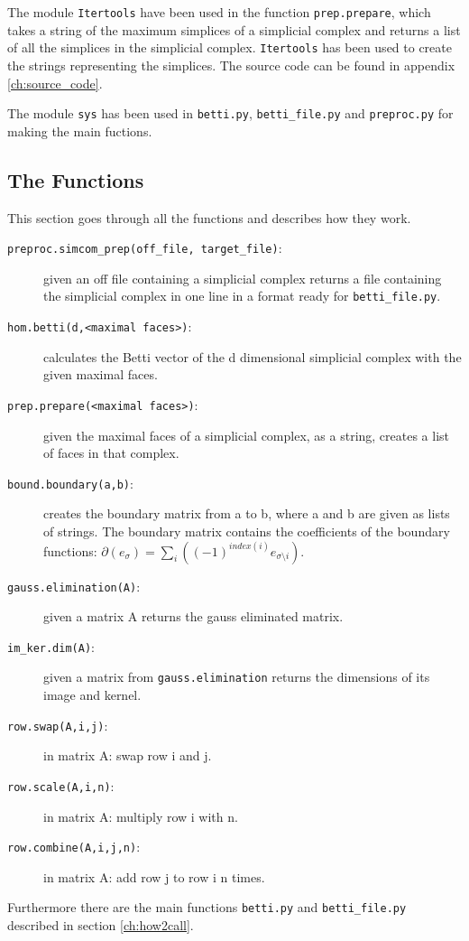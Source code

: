 \documentclass[11pt,a4paper,twoside, openright]{report}
\begin{document}
The module \texttt{Itertools} have been used in the function \texttt{prep.prepare}, which takes a string of the maximum simplices of a simplicial complex and returns a list of all the simplices in the simplicial complex. \texttt{Itertools} has been used to create the strings representing the simplices. The source code can be found in appendix \ref{ch:source_code}.

The module \texttt{sys} has been used in \texttt{betti.py}, \texttt{betti\_file.py} and \texttt{preproc.py} for making the main fuctions.

\subsection{The Functions}

This section goes through all the functions and describes how they work.

\begin{description}
\item[\texttt{preproc.simcom\_prep(off\_file, target\_file)}:] given an off file containing a simplicial complex returns a file containing the simplicial complex in one line in a format ready for \texttt{betti\_file.py}. 
\item[\texttt{hom.betti(d,<maximal faces>)}:] calculates the Betti vector of the d dimensional simplicial complex with the given maximal faces.
\item[\texttt{prep.prepare(<maximal faces>)}:] given the maximal faces of a simplicial complex, as a string, creates a list of faces in that complex.
\item[\texttt{bound.boundary(a,b)}:]creates the boundary matrix from a to b, where a and b are given as lists of strings. The boundary matrix contains the coefficients of the boundary functions: $\partial(e_{\sigma}) = \sum_i((-1)^{index(i)}e_{\sigma\setminus i})$.
\item[\texttt{gauss.elimination(A)}:] given a matrix A returns the gauss eliminated matrix.
\item[\texttt{im\_ker.dim(A)}:] given a matrix from \texttt{gauss.elimination} returns the dimensions of its image and kernel.
\item[\texttt{row.swap(A,i,j)}:] in matrix A: swap row i and j.
\item[\texttt{row.scale(A,i,n)}:] in matrix A: multiply row i with n.
\item[\texttt{row.combine(A,i,j,n)}:] in matrix A: add row j to row i n times.
\end{description}
Furthermore there are the main functions \texttt{betti.py} and \texttt{betti\_file.py} described in section \ref{ch:how2call}.
\end{document}
